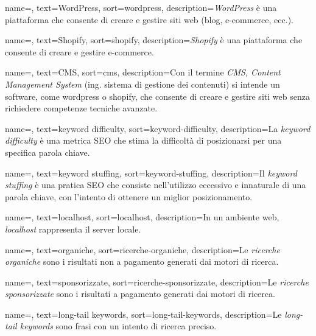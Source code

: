  {
    name=,
    text=WordPress,
    sort=wordpress,
    description={\emph{WordPress} è una piattaforma che consente di creare e gestire siti web (blog, e-commerce, ecc.).}
}

 {
    name=,
    text=Shopify,
    sort=shopify,
    description={\emph{Shopify} è una piattaforma che consente di creare e gestire e-commerce.}
}

 {
    name=,
    text=CMS,
    sort=cms,
    description={Con il termine \emph{CMS, Content Management System} (ing. sistema di gestione dei contenuti) si intende un software, come \gls{wordpress} o \gls{shopify}, che consente di creare e gestire siti web senza richiedere competenze tecniche avanzate.}
}

 {
    name=,
    text=keyword difficulty,
    sort=keyword-difficulty,
    description={La \emph{keyword difficulty} è una metrica SEO che stima la difficoltà di posizionarsi per una specifica parola chiave.}
}

 {
    name=,
    text=keyword stuffing,
    sort=keyword-stuffing,
    description={Il \emph{keyword stuffing} è una pratica SEO che consiste nell'utilizzo eccessivo e innaturale di una parola chiave, con l'intento di ottenere un miglior posizionamento.}
}

 {
    name=,
    text=localhost,
    sort=localhost,
    description={In un ambiente web, \emph{localhost} rappresenta il server locale.}
}

 {
    name=,
    text=organiche,
    sort=ricerche-organiche,
    description={Le \emph{ricerche organiche} sono i risultati non a pagamento generati dai motori di ricerca.}
}

 {
    name=,
    text=sponsorizzate,
    sort=ricerche-sponsorizzate,
    description={Le \emph{ricerche sponsorizzate} sono i risultati a pagamento generati dai motori di ricerca.}
}

 {
    name=,
    text=long-tail keywords,
    sort=long-tail-keywords,
    description={Le \emph{long-tail keywords} sono frasi con un intento di ricerca preciso.}
}

